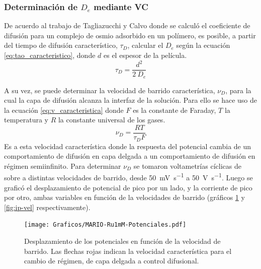 	 \subsubsection*{Determinación de $D_e$ mediante VC}	
	 
	   	 De acuerdo al trabajo de Tagliazucchi y Calvo\cite{Tagliazucchi2010a} donde se calculó el coeficiente de difusión para un complejo de osmio adsorbido en un polímero, es posible, a partir del tiempo de difusión característico, $\tau_{\scriptscriptstyle{D}}$, calcular el $D_e$ según la ecuación \ref{eq:tao_caracteristico}, donde $d$ es el espesor de la película. 
	   		\begin{equation}
					\tau_{\scriptscriptstyle{D}}=\frac{d^2}{2\ D_e}
					\label{eq:tao_caracteristico}
			 \end{equation} 
  	  	  
  	  	  A su vez, se puede determinar la  velocidad de barrido característica, $\nu_{\scriptscriptstyle{D}}$, para la cual la capa de difusión alcanza la interfaz de la solución. Para ello se hace uso de la ecuación \ref{eq:v_caracteristica} donde $F$ es la constante de Faraday, $T$ la temperatura y $R$ la constante universal de los gases.
	  	   	 \begin{equation}
					\nu_{\scriptscriptstyle{D}}=\frac{RT}{\tau_{\scriptscriptstyle{D}}F}
					\label{eq:v_caracteristica}
			 \end{equation}
	     \indent Es a esta velocidad característica donde la respuesta del potencial cambia de un comportamiento de difusión en capa delgada a un comportamiento de difusión en régimen semiinfinito. Para determinar $\nu_{\scriptscriptstyle{D}}$ se tomaron voltametrías cíclicas de \ru\space sobre \pdmF\space a distintas velocidades de barrido, desde \SI{50}{\milli\volt\per\second} a \SI{50}{\volt\per\second}. Luego se graficó el desplazamiento de potencial de pico por un lado, y la corriente de pico por otro, ambas variables en función de la velocidades de barrido (gráficos \ref{fig:corrimiento-potenciales} y \ref{fig:ip-vel} respectivamente).
	   			
			 \begin{figure}[ht!]
					\centering
			 	    \texttt{[image: Graficos/MARIO-Ru1mM-Potenciales.pdf]}
			        \caption[Desplazamiento de potenciales]{Desplazamiento de los potenciales en función de la velocidad de barrido. Las flechas rojas indican la velocidad característica para el cambio de régimen, de capa delgada a control difusional.}
			        \label{fig:corrimiento-potenciales}
			      	\end{figure}
         
